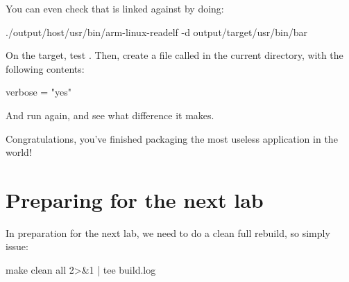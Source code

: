 You can even check that  is linked against
 by doing:

\begin{bashinput}
./output/host/usr/bin/arm-linux-readelf -d output/target/usr/bin/bar
\end{bashinput}

On the target, test . Then, create a file called
 in the current directory, with the following contents:

\begin{fileinput}
verbose = "yes"
\end{fileinput}

And run  again, and see what difference it makes.

Congratulations, you've finished packaging the most useless application
in the world!

\section{Preparing for the next lab}

In preparation for the next lab, we need to do a clean full rebuild,
so simply issue:

\begin{bashinput}
make clean all 2>&1 | tee build.log
\end{bashinput}
